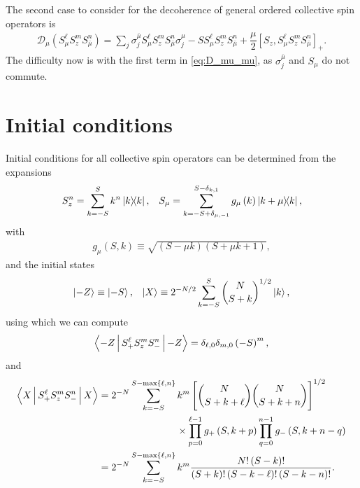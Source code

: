 \documentclass[aps,notitlepage,nofootinbib,11pt]{revtex4-1}
\newcommand{\f}[2]{\dfrac{#1}{#2}} %
\newcommand{\p}[1]{\left(#1\right)} %
\renewcommand{\sp}[1]{\left[#1\right]} %
\renewcommand{\set}[1]{\left\{#1\right\}} %
\newcommand{\bk}{\Braket} %
\newcommand{\D}{\mathcal{D}}
\newcommand{\bmu}{{\bar\mu}}
\newcommand{\1}{\mathds{1}}
\begin{document}
The second case to consider for the decoherence of general ordered
collective spin operators is
\begin{align}
  \D_\mu\p{S_\mu^\ell S_z^m S_\bmu^n}
  = \sum_j\sigma_j^\bmu S_\mu^\ell S_z^m S_\bmu^n \sigma_j^\mu
  - S S_\mu^\ell S_z^m S_\bmu^n
  + \f{\mu}{2} \sp{S_z, S_\mu^\ell S_z^m S_\bmu^n}_+.
  \label{eq:D_mu_mu}
\end{align}
The difficulty now is with the first term in \eqref{eq:D_mu_mu}, as
$\sigma_j^\bmu$ and $S_\mu$ do not commute.


\section{Initial conditions}
\label{sec:initial_conditions}

Initial conditions for all collective spin operators can be determined
from the expansions
\begin{align}
  S_z^n = \sum_{k=-S}^S k^n \op{k},
  &&
  S_\mu
  = \sum_{k=-S+\delta_{\mu,-1}}^{S-\delta_{k,1}}
  g_\mu\p{k} \op{k+\mu}{k},
\end{align}
with
\begin{align}
  g_\mu\p{S,k} \equiv \sqrt{\p{S-\mu k}\p{S+\mu k+1}},
\end{align}
and the initial states
\begin{align}
  \ket{-Z} \equiv \ket{-S},
  &&
  \ket{X} \equiv 2^{-N/2} \sum_{k=-S}^S { N \choose S+k }^{1/2} \ket{k},
\end{align}
using which we can compute
\begin{align}
  \bk{-Z|S_+^\ell S_z^m S_-^n|-Z}
  = \delta_{\ell,0} \delta_{m,0} \p{-S}^m,
\end{align}
and
\begin{align}
  \bk{X|S_+^\ell S_z^m S_-^n|X}
  &=  2^{-N} \sum_{k=-S}^{S-\max\set{\ell,n}} k^m
  \sp{{ N \choose S+k+\ell } { N \choose S+k+n }}^{1/2} \tag*{} \\
  &\qquad\qquad\qquad\qquad
  \times \prod_{p=0}^{\ell-1} g_+\p{S,k+p}
  \prod_{q=0}^{n-1} g_-\p{S,k+n-q} \\
  &= 2^{-N} \sum_{k=-S}^{S-\max\set{\ell,n}} k^m
  \f{N!\p{S-k}!}{\p{S+k}!\p{S-k-\ell}!\p{S-k-n}!}.
\end{align}
\end{document}
